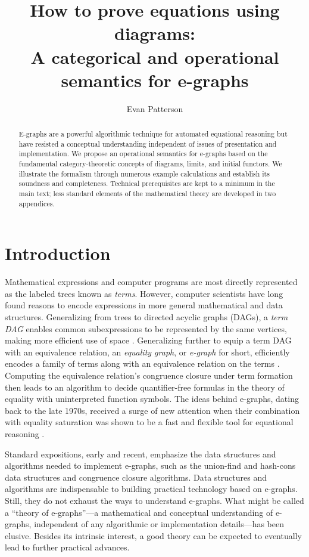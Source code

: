 \documentclass[11pt]{article}
\title{How to prove equations using diagrams: \\
  A categorical and operational semantics for e-graphs}
\author{Evan Patterson}
\date{}
\numberwithin{equation}{section}
\begin{document}
\maketitle

\begin{abstract}
  E-graphs are a powerful algorithmic technique for automated equational
  reasoning but have resisted a conceptual understanding independent of issues
  of presentation and implementation. We propose an operational semantics for
  e-graphs based on the fundamental category-theoretic concepts of diagrams,
  limits, and initial functors. We illustrate the formalism through numerous
  example calculations and establish its soundness and completeness. Technical
  prerequisites are kept to a minimum in the main text; less standard elements
  of the mathematical theory are developed in two appendices.
\end{abstract}

\section{Introduction}
\label{sec:introduction}

Mathematical expressions and computer programs are most directly represented as
the labeled trees known as \emph{terms}. However, computer scientists have long
found reasons to encode expressions in more general mathematical and data
structures. Generalizing from trees to directed acyclic graphs (DAGs), a
\emph{term DAG} enables common subexpressions to be represented by the same
vertices, making more efficient use of space \cite{paterson1978}. Generalizing
further to equip a term DAG with an equivalence relation, an \emph{equality
  graph}, or \emph{e-graph} for short, efficiently encodes a family of terms
along with an equivalence relation on the terms
\cite{nelson1980,nelson-oppen1980}. Computing the equivalence relation's
congruence closure under term formation then leads to an algorithm to decide
quantifier-free formulas in the theory of equality with uninterpreted function
symbols. The ideas behind e-graphs, dating back to the late 1970s, received a
surge of new attention when their combination with equality saturation
\cite{tate2009} was shown to be a fast and flexible tool for equational
reasoning \cite{willsey2021}.

Standard expositions, early and recent, emphasize the data structures and
algorithms needed to implement e-graphs, such as the union-find
\cite{tarjan1975} and hash-cons data structures and congruence closure
algorithms. Data structures and algorithms are indispensable to building
practical technology based on e-graphs. Still, they do not exhaust the ways to
understand e-graphs. What might be called a ``theory of e-graphs''---a
mathematical and conceptual understanding of e-graphs, independent of any
algorithmic or implementation details---has been elusive. Besides its intrinsic
interest, a good theory can be expected to eventually lead to further practical
advances.
\end{document}
